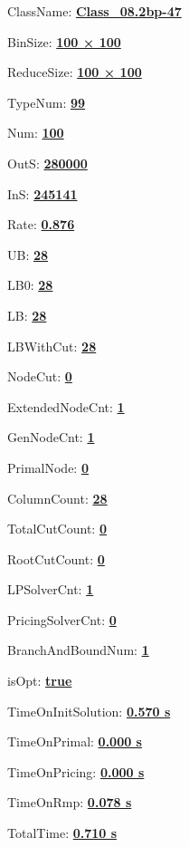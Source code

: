 \documentclass[11pt]{article}
\begin{document}
\pagestyle{empty}


ClassName: \underline{\textbf{Class_08.2bp-47}}
\par
BinSize: \underline{\textbf{100 × 100}}
\par
ReduceSize: \underline{\textbf{100 × 100}}
\par
TypeNum: \underline{\textbf{99}}
\par
Num: \underline{\textbf{100}}
\par
OutS: \underline{\textbf{280000}}
\par
InS: \underline{\textbf{245141}}
\par
Rate: \underline{\textbf{0.876}}
\par
UB: \underline{\textbf{28}}
\par
LB0: \underline{\textbf{28}}
\par
LB: \underline{\textbf{28}}
\par
LBWithCut: \underline{\textbf{28}}
\par
NodeCut: \underline{\textbf{0}}
\par
ExtendedNodeCnt: \underline{\textbf{1}}
\par
GenNodeCnt: \underline{\textbf{1}}
\par
PrimalNode: \underline{\textbf{0}}
\par
ColumnCount: \underline{\textbf{28}}
\par
TotalCutCount: \underline{\textbf{0}}
\par
RootCutCount: \underline{\textbf{0}}
\par
LPSolverCnt: \underline{\textbf{1}}
\par
PricingSolverCnt: \underline{\textbf{0}}
\par
BranchAndBoundNum: \underline{\textbf{1}}
\par
isOpt: \underline{\textbf{true}}
\par
TimeOnInitSolution: \underline{\textbf{0.570 s}}
\par
TimeOnPrimal: \underline{\textbf{0.000 s}}
\par
TimeOnPricing: \underline{\textbf{0.000 s}}
\par
TimeOnRmp: \underline{\textbf{0.078 s}}
\par
TotalTime: \underline{\textbf{0.710 s}}
\par
\newpage


\end{document}
